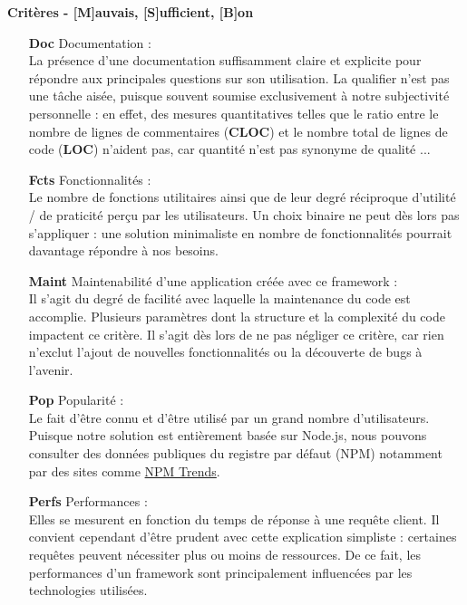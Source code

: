 \noindent\textbf{Critères - [M]auvais, [S]ufficient, [B]on}

\begin{itemize}
    \item[\textbf{Doc}] Documentation : \\
    La présence d'une documentation suffisamment claire et explicite pour répondre aux principales questions sur son utilisation.
    La qualifier n'est pas une tâche aisée, puisque souvent soumise exclusivement à notre subjectivité personnelle : en effet, des mesures quantitatives telles que le ratio entre le nombre de lignes de commentaires (\textbf{CLOC}) et le nombre total de lignes de code (\textbf{LOC}) n'aident pas, car quantité n'est pas synonyme de qualité ... 
    \item[\textbf{Fcts}] Fonctionnalités : \\
    Le nombre de fonctions utilitaires ainsi que de leur degré réciproque d'utilité / de praticité perçu par les utilisateurs. Un choix binaire ne peut dès lors pas s'appliquer : une solution minimaliste en nombre de fonctionnalités pourrait davantage répondre à nos besoins.
    \item[\textbf{Maint}] Maintenabilité d'une application créée avec ce framework : \\
    Il s'agit du degré de facilité avec laquelle la maintenance du code est accomplie. Plusieurs paramètres dont la structure et la complexité du code impactent ce critère. Il s'agit dès lors de ne pas négliger ce critère, car rien n'exclut l'ajout de nouvelles fonctionnalités ou la découverte de bugs à l'avenir.
    \item[\textbf{Pop}] Popularité : \\
    Le fait d'être connu et d'être utilisé par un grand nombre d'utilisateurs.
    Puisque notre solution est entièrement basée sur Node.js, nous pouvons consulter des données publiques du registre par défaut (NPM) notamment par des sites comme \href{https://www.npmtrends.com/}{NPM Trends}.
    \item[\textbf{Perfs}] Performances : \\
    Elles se mesurent en fonction du temps de réponse à une requête client.
    Il convient cependant d'être prudent avec cette explication simpliste : certaines requêtes peuvent nécessiter plus ou moins de ressources.
    De ce fait, les performances d'un framework sont principalement influencées par les technologies utilisées. 
\end{itemize}

